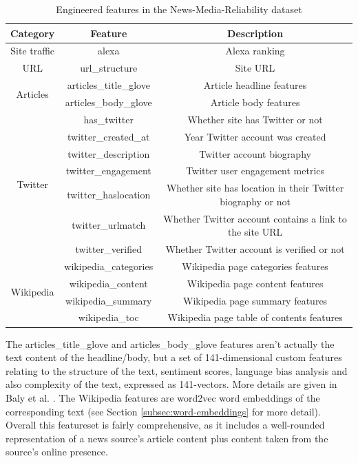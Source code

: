 \begin{table}[h!]
    \centering
    \begin{tabular}{|c|c|c|}
        \hline
        \textbf{Category} & \textbf{Feature} & \textbf{Description} \\
        \hline
        Site traffic & alexa & Alexa ranking \\
        \hline
        URL & url\_structure & Site URL \\
        \hline
        \multirow{2}{4em}{Articles} & articles\_title\_glove & Article headline features \\
        & articles\_body\_glove & Article body features \\
        \hline
        \multirow{7}{4em}{Twitter} & has\_twitter & Whether site has Twitter or not \\
        & twitter\_created\_at & Year Twitter account was created \\
        & twitter\_description & Twitter account biography \\
        & twitter\_engagement & Twitter user engagement metrics \\
        & twitter\_haslocation & Whether site has location in their Twitter biography or not \\
        & twitter\_urlmatch & Whether Twitter account contains a link to the site URL \\
        & twitter\_verified & Whether Twitter account is verified or not \\
        \hline
        \multirow{4}{4em}{Wikipedia} & wikipedia\_categories & Wikipedia page categories features \\
        & wikipedia\_content & Wikipedia page content features \\
        & wikipedia\_summary & Wikipedia page summary features \\
        & wikipedia\_toc &  Wikipedia page table of contents features \\
        \hline
    \end{tabular}
    \caption{Engineered features in the News-Media-Reliability dataset}
    \label{tab:nmr-features}
\end{table}

The articles\_title\_glove and articles\_body\_glove features aren't actually the text content of the headline/body, but a set of 141-dimensional custom features relating to the structure of the text, sentiment scores, language bias analysis and also complexity of the text, expressed as 141-vectors. More details are given in Baly et al. \cite{baly-emnlp18}. The Wikipedia features are word2vec word embeddings of the corresponding text (see Section \ref{subsec:word-embeddings} for more detail). Overall this featureset is fairly comprehensive, as it includes a well-rounded representation of a news source's article content plus content taken from the source's online presence.

